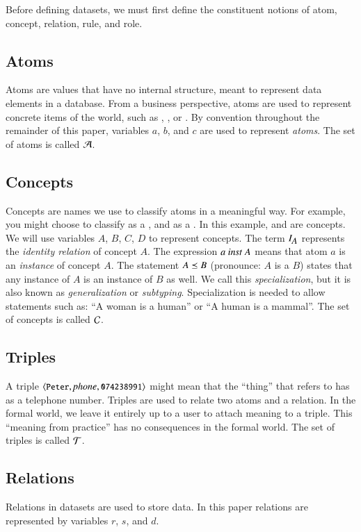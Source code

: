 \documentclass{elsarticle}
\begin{document}
	Before defining datasets, we must first define the constituent notions of atom, concept, relation, rule, and role.
\subsection{Atoms}
	Atoms are values that have no internal structure, meant to represent data elements in a database.
	From a business perspective, atoms are used to represent concrete items of the world,
	such as , , or .
	By convention throughout the remainder of this paper, variables $a$, $b$, and $c$ are used to represent \emph{atoms}.
	The set of atoms is called $\mathcal{A}$.
	
\subsection{Concepts}
	Concepts are names we use to classify atoms in a meaningful way.
	For example, you might choose to classify  as a , and  as a .
	In this example,  and  are concepts.
    We will use variables $A$, $B$, $C$, $D$ to represent concepts.
	The term $I_{\text{\it \small A\/}}$ represents the \emph{identity relation} of concept $A$.
	The expression $a\ \text{\it inst\/}\ A$ means that atom $a$ is an \emph{instance} of concept $A$.
	The statement $A\preceq B$ (pronounce: $A$ is a $B$) states that any instance of $A$ is an instance of $B$ as well.
	We call this {\em specialization}, but it is also known as {\em generalization} or {\em subtyping}.
	Specialization is needed to allow statements such as: ``A woman is a human'' or ``A human is a mammal''.
	The set of concepts is called $\mathcal{C}$.
	
\subsection{Triples}
	A triple $\langle{\text{{\tt\small Peter}}},{\text{\it phone\/}},{\text{{\tt\small 074238991}}}\rangle$ might mean that the ``thing'' that  refers to
	has  as a telephone number.
	Triples are used to relate two atoms and a relation.
	In the formal world, we leave it entirely up to a user to attach meaning to a triple.
	This ``meaning from practice'' has no consequences in the formal world.
	The set of triples is called $\mathcal{T}$.

\subsection{Relations}
	Relations in datasets are used to store data.
	In this paper relations are represented by variables $r$, $s$, and $d$.
\end{document}
